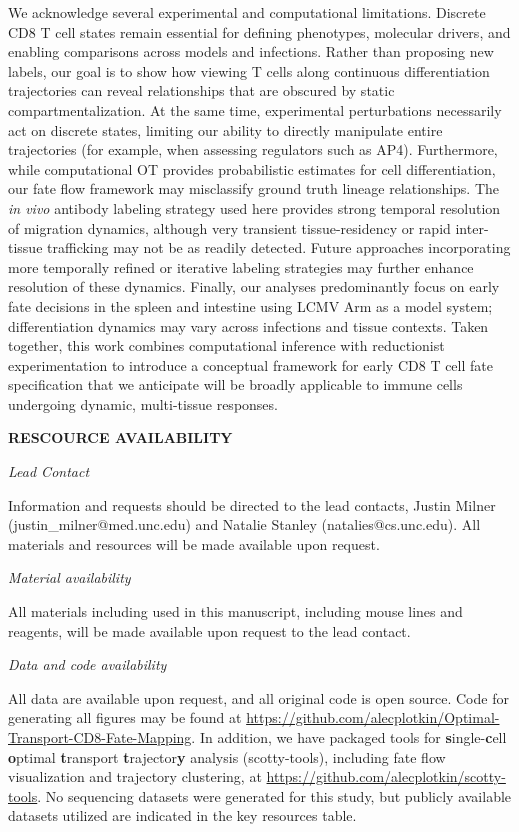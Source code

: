 We acknowledge several experimental and computational limitations.
Discrete CD8 T cell states remain essential for defining phenotypes,
molecular drivers, and enabling comparisons across models and
infections. Rather than proposing new labels, our goal is to show how
viewing T cells along continuous differentiation trajectories can reveal
relationships that are obscured by static compartmentalization. At the
same time, experimental perturbations necessarily act on discrete
states, limiting our ability to directly manipulate entire trajectories
(for example, when assessing regulators such as AP4). Furthermore, while
computational OT provides probabilistic estimates for cell
differentiation, our fate flow framework may misclassify ground truth
lineage relationships. The \emph{in vivo} antibody labeling strategy
used here provides strong temporal resolution of migration dynamics,
although very transient tissue-residency or rapid inter-tissue
trafficking may not be as readily detected. Future approaches
incorporating more temporally refined or iterative labeling strategies
may further enhance resolution of these dynamics. Finally, our analyses
predominantly focus on early fate decisions in the spleen and intestine
using LCMV Arm as a model system; differentiation dynamics may vary
across infections and tissue contexts. Taken together, this work
combines computational inference with reductionist experimentation to
introduce a conceptual framework for early CD8 T cell fate specification
that we anticipate will be broadly applicable to immune cells undergoing
dynamic, multi-tissue responses.

\textbf{RESCOURCE AVAILABILITY}

\emph{Lead Contact}

Information and requests should be directed to the lead contacts, Justin
Milner (justin\_milner@med.unc.edu) and Natalie Stanley
(natalies@cs.unc.edu). All materials and resources will be made
available upon request.

\emph{Material availability}

All materials including used in this manuscript, including mouse lines
and reagents, will be made available upon request to the lead contact.

\emph{Data and code availability }

All data are available upon request, and all original code is open
source. Code for generating all figures may be found at
\url{https://github.com/alecplotkin/Optimal-Transport-CD8-Fate-Mapping}.
In addition, we have packaged tools for
\textbf{{s}}ingle-\textbf{{c}}ell \textbf{{o}}ptimal
\textbf{{t}}ransport \textbf{{t}}rajector\textbf{{y}} analysis
(scotty-tools), including fate flow visualization and trajectory
clustering, at \url{https://github.com/alecplotkin/scotty-tools}. No
sequencing datasets were generated for this study, but publicly
available datasets utilized are indicated in the key resources table.

